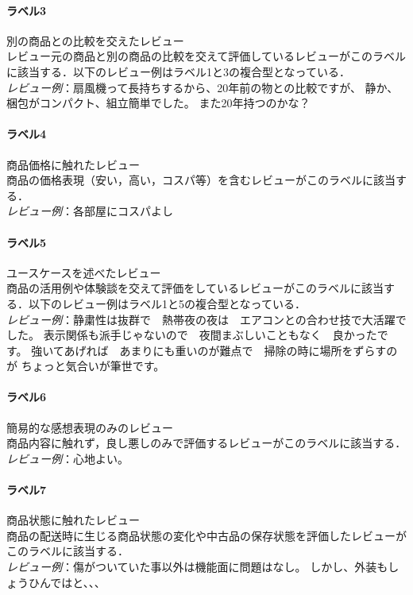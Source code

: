 \documentclass[
  platex, dvipdfmx,  %
]{nlp2024}
\begin{document}
\paragraph{ラベル3} 別の商品との比較を交えたレビュー\\
レビュー元の商品と別の商品の比較を交えて評価しているレビューがこのラベルに該当する．以下のレビュー例はラベル1と3の複合型となっている．\\
\emph{レビュー例}：扇風機って長持ちするから、20年前の物との比較ですが、
静か、梱包がコンパクト、組立簡単でした。
また20年持つのかな？\\
\paragraph{ラベル4} 商品価格に触れたレビュー\\
商品の価格表現（安い，高い，コスパ等）を含むレビューがこのラベルに該当する．\\
\emph{レビュー例}：各部屋にコスパよし\\
\paragraph{ラベル5} ユースケースを述べたレビュー\\
商品の活用例や体験談を交えて評価をしているレビューがこのラベルに該当する．以下のレビュー例はラベル1と5の複合型となっている．\\
\emph{レビュー例}：静粛性は抜群で　熱帯夜の夜は　エアコンとの合わせ技で大活躍でした。
表示関係も派手じゃないので　夜間まぶしいこともなく　良かったです。
強いてあげれば　あまりにも重いのが難点で　掃除の時に場所をずらすのが
ちょっと気合いが筆世です。\\
\paragraph{ラベル6} 簡易的な感想表現のみのレビュー\\
商品内容に触れず，良し悪しのみで評価するレビューがこのラベルに該当する．\\
\emph{レビュー例}：心地よい。\\

\paragraph{ラベル7} 商品状態に触れたレビュー\\
商品の配送時に生じる商品状態の変化や中古品の保存状態を評価したレビューがこのラベルに該当する．\\
\emph{レビュー例}：傷がついていた事以外は機能面に問題はなし。
しかし、外装もしょうひんではと、、、\\
\end{document}
